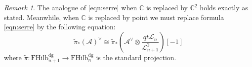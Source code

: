 \documentclass[12pt]{amsart}
\numberwithin{equation}{section}
\newtheorem{lemma}[theorem]{Lemma}
\theoremstyle{definition}
\theoremstyle{remark}
\newtheorem{remark}[theorem]{Remark}
\DeclareMathOperator{\Hom}{Hom}
\newcommand{\CC}{\mathbb{C}}
\newcommand{\PP}{\mathbb{P}}
\newcommand{\CA}{\mathcal{A}}
\newcommand{\CE}{\mathcal{E}}
\newcommand{\CK}{\mathcal{K}}
\newcommand{\CL}{\mathcal{L}}
\newcommand{\CO}{\mathcal{O}}
\newcommand{\CT}{\mathcal{T}}
\renewcommand{\1}{\mathbf{1}}
\newcommand{\FH}{\mathrm{FHilb}}
\newcommand{\dg}{\text{dg}}%
\begin{document}
\begin{remark}

The analogue of \eqref{eqn:serre} when $\CC$ is replaced by $\CC^2$ holds exactly as stated. Meanwhile, when $\CC$ is replaced by point we must replace formula \eqref{eqn:serre} by the following equation:
\begin{equation}
\label{eqn:serre2}
\widetilde{\pi}_*(\CA)^\vee \cong \widetilde{\pi}_*\left(\CA^\vee\otimes \frac {qt \CL_n}{\CL_{n+1}^{2}} \right)[-1]
\end{equation}
where $\widetilde{\pi}:\FH_{n+1}^\dg \rightarrow \FH_n^\dg$ is the standard projection. 

\end{remark}




 


\end{document}
